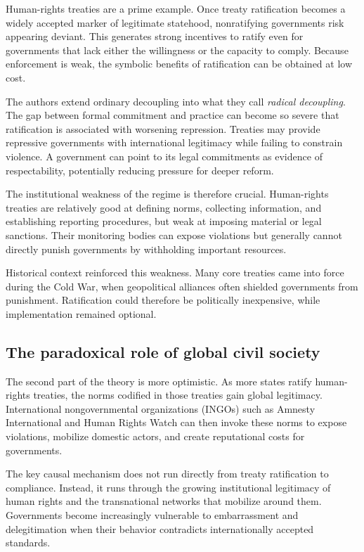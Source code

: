 Human-rights treaties are a prime example. Once treaty ratification becomes a widely accepted marker of legitimate statehood, nonratifying governments risk appearing deviant. This generates strong incentives to ratify even for governments that lack either the willingness or the capacity to comply. Because enforcement is weak, the symbolic benefits of ratification can be obtained at low cost.

The authors extend ordinary decoupling into what they call \textit{radical decoupling}. The gap between formal commitment and practice can become so severe that ratification is associated with worsening repression. Treaties may provide repressive governments with international legitimacy while failing to constrain violence. A government can point to its legal commitments as evidence of respectability, potentially reducing pressure for deeper reform.

The institutional weakness of the regime is therefore crucial. Human-rights treaties are relatively good at defining norms, collecting information, and establishing reporting procedures, but weak at imposing material or legal sanctions. Their monitoring bodies can expose violations but generally cannot directly punish governments by withholding important resources.

Historical context reinforced this weakness. Many core treaties came into force during the Cold War, when geopolitical alliances often shielded governments from punishment. Ratification could therefore be politically inexpensive, while implementation remained optional.

\subsection{The paradoxical role of global civil society}

The second part of the theory is more optimistic. As more states ratify human-rights treaties, the norms codified in those treaties gain global legitimacy. International nongovernmental organizations (INGOs) such as Amnesty International and Human Rights Watch can then invoke these norms to expose violations, mobilize domestic actors, and create reputational costs for governments.

The key causal mechanism does not run directly from treaty ratification to compliance. Instead, it runs through the growing institutional legitimacy of human rights and the transnational networks that mobilize around them. Governments become increasingly vulnerable to embarrassment and delegitimation when their behavior contradicts internationally accepted standards.

